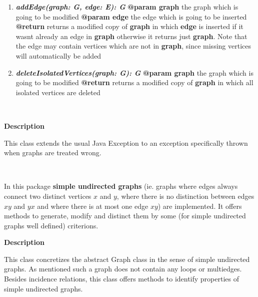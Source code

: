 \begin{enumerate}[+]
		~\newpage
		
		\item{
			\textbf{\textit{addEdge(graph: G, edge: E): G}} \newline
			\textbf{@param graph} the graph which is going to be modified \newline
			\textbf{@param edge} the edge which is going to be inserted \newline
			\textbf{@return} returns a modified copy of \textbf{graph} in which \textbf{edge} is inserted if it wasnt already an edge in \textbf{graph} otherwise it returns just \textbf{graph}. Note that the edge may contain vertices which are not in \textbf{graph}, since missing vertices will automatically be added
		}
		\item{
			\textbf{\textit{deleteIsolatedVertices(graph: G): G}} \newline
			\textbf{@param graph} the graph which is going to be modified \newline
			\textbf{@return} returns a modified copy of \textbf{graph} in which all isolated vertices are deleted		}
	\end{enumerate}
	
	~\newline
	~\newline
	~\newline
	
	\textbf{Description}
	
	This class extends the usual Java Exception to an exception specifically thrown when graphs are treated wrong.
		
	~\newpage
	
	
	In this package \textbf{simple undirected graphs} (ie. graphs where edges always connect two distinct vertices $x$ and $y$, where there is no distinction between edges $xy$ and $yx$ and where there is at most one edge $xy$) are implemented. It offers methods to generate, modify and distinct them by some (for simple undirected graphs well defined) criterions.
		
	
	\textbf{Description}
	
	This class concretizes the abstract Graph class in the sense of simple undirected graphs. As mentioned such a graph does not contain any loops or multiedges. Besides incidence relations, this class offers methods to identify properties of simple undirected graphs.
	
